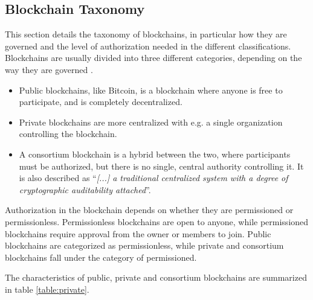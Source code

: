 \subsection{Blockchain Taxonomy}
This section details the taxonomy of blockchains, in particular how they are governed and the level of authorization needed in the different classifications.
Blockchains are usually divided into three different categories, depending on the way they are governed \cite{Ethereum_pub_priv, taxonomy, Zheng_overview}.

\begin{itemize}
\item Public blockchains, like Bitcoin, is a blockchain where anyone is free to participate, and is completely decentralized.
\item Private blockchains are more centralized with e.g. a single organization controlling the blockchain.
\item A consortium blockchain is a hybrid between the two, where participants must be authorized, but there is no single, central authority controlling it. It is also described as \enquote{\textit{[...] a traditional centralized system with a degree of cryptographic auditability attached}}\cite{Ethereum_pub_priv}.
\end{itemize}

Authorization in the blockchain depends on whether they are  permissioned or permissionless. Permissionless blockchains are open to anyone, while permissioned blockchains require approval from the owner or members to join. Public blockchains are categorized as permissionless, while private and consortium blockchains fall under the category of permissioned.

The characteristics of public, private and consortium blockchains are summarized in table \ref{table:private}.

